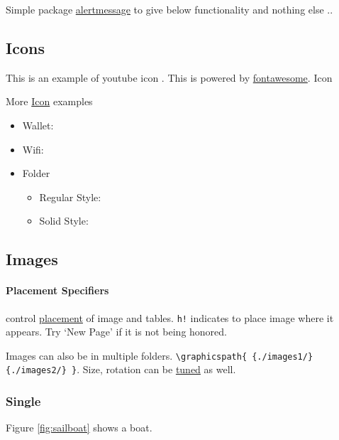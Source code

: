\documentclass{report}[a4paper,12pt] %
\begin{document}
Simple package \href{https://www.ctan.org/pkg/alertmessage}{alertmessage} to give below
functionality and nothing else ..


\subsection{Icons}
This is an example of youtube icon . This is powered by \href{https://www.ctan.org/pkg/fontawesome}{fontawesome}.
Icon

More \href{https://fontawesome.com/v5/search?o=r&m=free}{Icon} examples
\begin{itemize}
  \item Wallet: 
  \item Wifi: 
  \item Folder
  \begin{itemize}
    \item Regular Style: 
    \item Solid Style: 
  \end{itemize}
\end{itemize}

\newpage
\subsection{Images}

\paragraph{Placement Specifiers} control \href{https://www.overleaf.com/learn/latex/Positioning_images_and_tables#The_figure_environment}{placement} of image and tables.
\verb|h!| indicates to place image where it appears. Try `New Page' if it is not being honored.

Images can also be in multiple folders. \verb|\graphicspath{ {./images1/}{./images2/} }|.
Size, rotation can be \href{https://www.overleaf.com/learn/latex/Inserting_Images}{tuned} as well.

\subsubsection{Single}

Figure \ref{fig:sailboat} shows a boat. %
\end{document}
